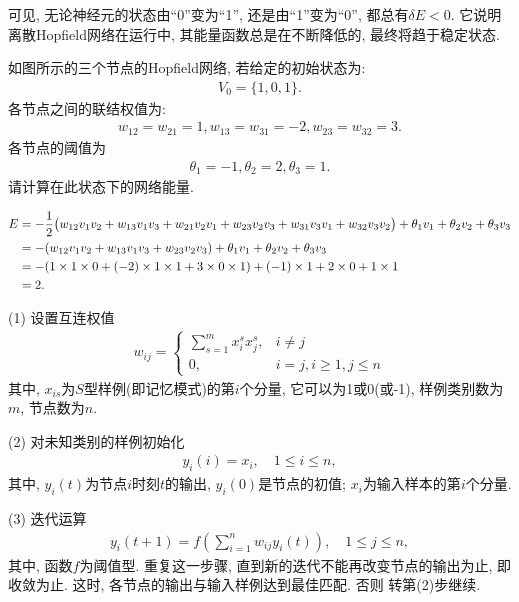 可见, 无论神经元的状态由“0”变为“1”, 还是由“1”变为“0”, 都总有$\delta E<0$. 它说明离散Hopfield网络在运行中, 其能量函数总是在不断降低的, 最终将趋于稳定状态.
\begin{example}
如图所示的三个节点的Hopfield网络, 若给定的初始状态为:
\begin{align*}
  V_0=\{1,0,1\}.
\end{align*}
各节点之间的联结权值为:
\begin{align*}
     w_{12}=w_{21}=1, w_{13}=w_{31}=-2, w_{23}=w_{32}=3.
\end{align*}
各节点的阈值为
\begin{align*}
  \theta_1=-1, \theta_2=2, \theta_3=1.
\end{align*}
请计算在此状态下的网络能量.
\end{example}
\begin{result}
\begin{align}
E&=-\frac 1 2 \big(w_{12}v_1v_2+w_{13}v_1v_3+w_{21}v_2 v_1+w_{23}v_2v_3+w_{31}v_3v_1+w_{32}v_3 v_2\big)+ \theta_1 v_1+ \theta_2v_2+ \theta_3v_3\notag\\
    &= -(w_{12}v_1v_2+w_{13}v_1v_3+w_{23}v_2v_3)+ \theta_1v_1+\theta_2v_2+\theta_3v_3\notag\\
    &=-(1\times 1\times 0+(-2)\times 1\times 1+3\times 0\times 1)+(-1) \times 1+2\times 0+1\times 1\notag\\
    &=2.
\end{align}

(1) 设置互连权值
\begin{align}
  w_{i j}=\left\{\begin{array}{ll}{\sum_{s=1}^{m} x_{i}^{s} x_{j}^{s},} & {i \neq j} \\ {0,} & {i=j, i \geq 1, j \leq n}\end{array}\right.
\end{align}
其中, $x_{is}$为$S$型样例(即记忆模式)的第$i$个分量, 它可以为1或0(或-1), 样例类别数为$m$, 节点数为$n$.

(2) 对未知类别的样例初始化
\begin{align}
 y_{i}(i)=x_{i}, \quad 1 \leq i \leq n,
\end{align}
其中, $y_i(t)$为节点$i$时刻$t$的输出, $y_i(0)$是节点的初值; $x_i$为输入样本的第$i$个分量.

(3) 迭代运算
\begin{align}
  y_{i}(t+1)=f\left(\sum_{i=1}^{n} w_{i j} y_{i}(t)\right), \quad 1 \leq j \leq n,
\end{align}
其中, 函数$f$为阈值型. 重复这一步骤, 直到新的迭代不能再改变节点的输出为止, 即收敛为止. 这时, 各节点的输出与输入样例达到最佳匹配. 否则 转第(2)步继续.
\end{result}
